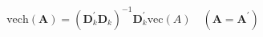 \begin{equation}
	\mathrm{vech}
	\left(
	\mathbf{A}
	\right)
	=
	\left(
	\mathbf{D}_{k}^{\prime}
	\mathbf{D}_{k}
	\right)^{-1}
	\mathbf{D}_{k}^{\prime}
	\mathrm{vec}
	\left(
	A
	\right)
	\quad
	\left(
	\mathbf{A}
	=
	\mathbf{A}^{\prime}
	\right)
	\label{eq:linearAlgebra-vech-and-dcap}
\end{equation}
